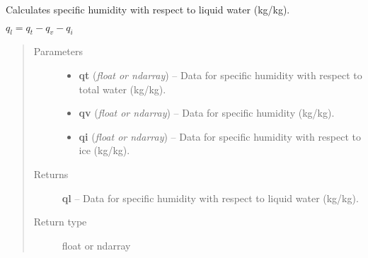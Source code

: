 \documentclass[letterpaper,10pt,english]{sphinxmanual}
\begin{document}
\begin{fulllineitems}
\label{atmos:atmos.equations.ql_from_qt_qv_qi}
Calculates specific humidity with respect to liquid water (kg/kg).

\(q_l = q_t-q_v-q_i\)
\begin{quote}\begin{description}
\item[{Parameters}] \leavevmode\begin{itemize}
\item {} 
\textbf{qt} (\emph{float or ndarray}) -- Data for specific humidity with respect to total water (kg/kg).

\item {} 
\textbf{qv} (\emph{float or ndarray}) -- Data for specific humidity (kg/kg).

\item {} 
\textbf{qi} (\emph{float or ndarray}) -- Data for specific humidity with respect to ice (kg/kg).

\end{itemize}

\item[{Returns}] \leavevmode
\textbf{ql} --
Data for specific humidity with respect to liquid water (kg/kg).

\item[{Return type}] \leavevmode
float or ndarray

\end{description}\end{quote}

\end{fulllineitems}

\end{document}
